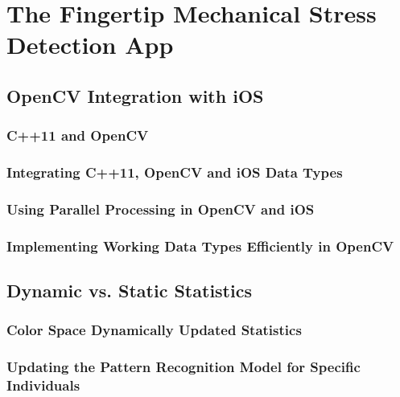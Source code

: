 
\chapter{The Fingertip Mechanical Stress Detection App}

\ifpdf
    \graphicspath{{Chapter4/Figs/Raster/}{Chapter4/Figs/PDF/}{Chapter4/Figs/}}
\else
    \graphicspath{{Chapter4/Figs/Vector/}{Chapter4/Figs/}}
\fi


\section{OpenCV Integration with iOS}\label{sec:OpenCVIntegrationWithIOS}
\subsection{C++11 and OpenCV}\label{sec:C++11AndOpenCV}
\subsection{Integrating C++11, OpenCV and iOS Data Types}\label{sec:IntegratingC++11AndIOSDataTypes}
\subsection{Using Parallel Processing in OpenCV and iOS}\label{sec:ParallelProcessingInOpenCVAndIOS}
\subsection{Implementing Working Data Types Efficiently in OpenCV}\label{sec:ImplementingDataTypesEfficientlyOpenCV}
\section{Dynamic vs. Static Statistics}\label{sec:DynamicVsStaticStatistics}
\subsection{Color Space Dynamically Updated Statistics}\label{sec:ColorSpaceDynamicallyUpdatedStatistics}
\subsection{Updating the Pattern Recognition Model for Specific Individuals}\label{sec:UpdatingPatternRecognitionModelForSpecificIndividuals}
